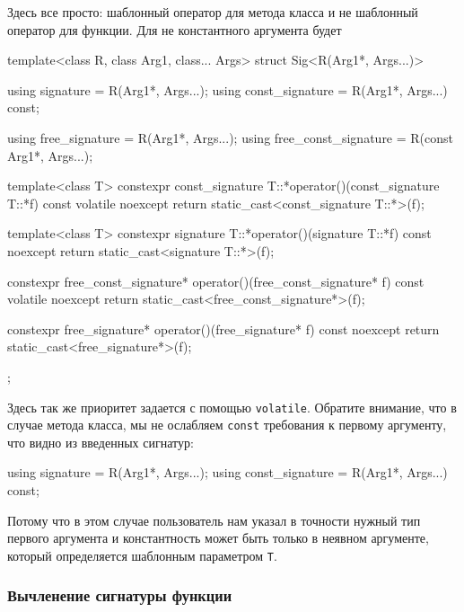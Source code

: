 Здесь все просто: шаблонный оператор для метода класса и не шаблонный оператор для функции.
Для не константного аргумента будет
\begin{cppcode}
template<class R, class Arg1, class... Args>
struct Sig<R(Arg1*, Args...)> {
  using signature = R(Arg1*, Args...);
  using const_signature = R(Arg1*, Args...) const;

  using free_signature = R(Arg1*, Args...);
  using free_const_signature = R(const Arg1*, Args...);

  template<class T>
  constexpr const_signature T::*operator()(const_signature T::*f) const volatile noexcept {
    return static_cast<const_signature T::*>(f);
  }

  template<class T>
  constexpr signature T::*operator()(signature T::*f) const noexcept {
    return static_cast<signature T::*>(f);
  }

  constexpr free_const_signature* operator()(free_const_signature* f) const volatile noexcept {
    return static_cast<free_const_signature*>(f);
  }

  constexpr free_signature* operator()(free_signature* f) const noexcept {
    return static_cast<free_signature*>(f);
  }
};
\end{cppcode}
Здесь так же приоритет задается с помощью \verb"volatile".
Обратите внимание, что в случае метода класса, мы не ослабляем \verb"const" требования к первому аргументу, что видно из введенных сигнатур:
\begin{cppcode}
using signature = R(Arg1*, Args...);
using const_signature = R(Arg1*, Args...) const;
\end{cppcode}
Потому что в этом случае пользователь нам указал в точности нужный тип первого аргумента и константность может быть только в неявном аргументе, который определяется шаблонным параметром \verb"T".

\subsubsection{Вычленение сигнатуры функции}
\label{section::ArgsOf}

